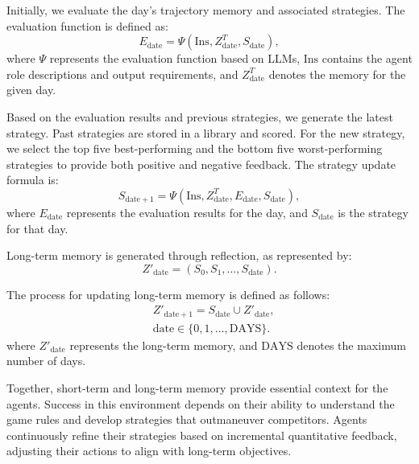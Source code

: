 Initially, we evaluate the day’s trajectory memory and associated strategies. The evaluation function is defined as:
\begin{equation}\label{evaluation}
	E_{\mathrm{date}} = \Psi \left(\mathrm{Ins}, Z_{\mathrm{date}}^T, S_{\mathrm{date}} \right),
\end{equation}
where $\Psi$ represents the evaluation function based on LLMs, $\mathrm{Ins}$ contains the agent role descriptions and output requirements, and $Z_{\mathrm{date}}^T$ denotes the memory for the given day.

Based on the evaluation results and previous strategies, we generate the latest strategy. Past strategies are stored in a library and scored. For the new strategy, we select the top five best-performing and the bottom five worst-performing strategies to provide both positive and negative feedback. The strategy update formula is:
\begin{equation}\label{reflection}
	S_{\mathrm{date} + 1} = \Psi \left(\mathrm{Ins}, Z_{\mathrm{date}}^T, E_{\mathrm{date}}, S_{\mathrm{date}} \right),
\end{equation}
where $E_{\mathrm{date}}$ represents the evaluation results for the day, and $S_{\mathrm{date}}$ is the strategy for that day.

Long-term memory is generated through reflection, as represented by:
\begin{equation}\label{Eq7}
	Z'_{\mathrm{date}} = \left(S_0, S_1, \dots, S_{\mathrm{date}} \right).
\end{equation}

The process for updating long-term memory is defined as follows:
\begin{equation}\label{Eq8}
\begin{aligned}
	& Z'_{\mathrm{date} + 1} = S_{\mathrm{date}} \cup Z'_{\mathrm{date}}, \\
	& \mathrm{date} \in \{0, 1, \dots, \mathrm{DAYS}\}.
\end{aligned} 
\end{equation}
where $Z'_{\mathrm{date}}$ represents the long-term memory, and $\mathrm{DAYS}$ denotes the maximum number of days.

Together, short-term and long-term memory provide essential context for the agents. Success in this environment depends on their ability to understand the game rules and develop strategies that outmaneuver competitors. Agents continuously refine their strategies based on incremental quantitative feedback, adjusting their actions to align with long-term objectives. 

